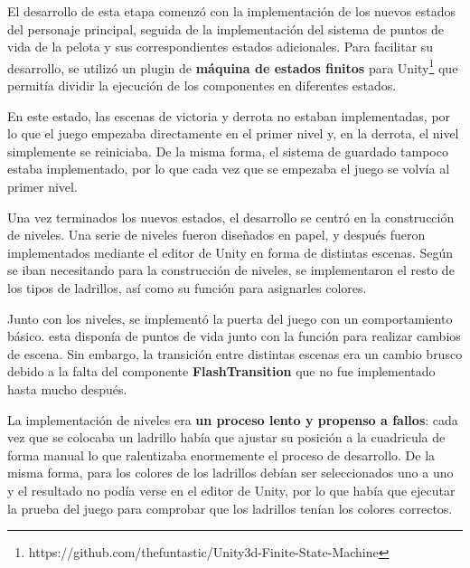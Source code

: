 El desarrollo de esta etapa comenzó con la implementación de los nuevos estados del personaje principal, seguida de la implementación del sistema de puntos de vida de la pelota y sus correspondientes estados adicionales. Para facilitar su desarrollo, se utilizó un plugin de \textbf{máquina de estados finitos} para Unity\footnote{https://github.com/thefuntastic/Unity3d-Finite-State-Machine} que permitía dividir la ejecución de los componentes en diferentes estados.

En este estado, las escenas de victoria y derrota no estaban implementadas, por lo que el juego empezaba directamente en el primer nivel y, en la derrota, el nivel simplemente se reiniciaba. De la misma forma, el sistema de guardado tampoco estaba implementado, por lo que cada vez que se empezaba el juego se volvía al primer nivel.

Una vez terminados los nuevos estados, el desarrollo se centró en la construcción de niveles. Una serie de niveles fueron diseñados en papel, y después fueron implementados mediante el editor de Unity en forma de distintas escenas. Según se iban necesitando para la construcción de niveles, se implementaron el resto de los tipos de ladrillos, así como su función para asignarles colores.

Junto con los niveles, se implementó la puerta del juego con un comportamiento básico. esta disponía de puntos de vida junto con la función para realizar cambios de escena. Sin embargo, la transición entre distintas escenas era un cambio brusco debido a la falta del componente \textbf{FlashTransition} que no fue implementado hasta mucho después.

La implementación de niveles era \textbf{un proceso lento y propenso a fallos}: cada vez que se colocaba un ladrillo había que ajustar su posición a la cuadricula de forma manual lo que ralentizaba enormemente el proceso de desarrollo. De la misma forma, para los colores de los ladrillos debían ser seleccionados uno a uno y el resultado no podía verse en el editor de Unity, por lo que había que ejecutar la prueba del juego para comprobar que los ladrillos tenían los colores correctos.

